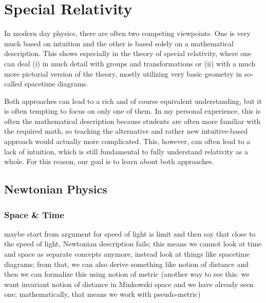 





\chapter{Special Relativity}

\begin{center}
In modern day physics, there are often two competing viewpoints. One is very much based on intuition and the other is based solely on a mathematical description. This shows especially in the theory of special relativity, where one can deal (i) in much detail with groups and transformations or (ii) with a much more pictorial version of the theory, mostly utilizing very basic geometry in so-called spacetime diagrams.

Both approaches can lead to a rich and of course equivalent understanding, but it is often tempting to focus on only one of them. In my personal experience, this is often the mathematical description because students are often more familiar with the required math, so teaching the alternative and rather new intuitive-based approach would actually more complicated. This, however, can often lead to a lack of intuition, which is still fundamental to fully understand relativity as a whole. For this reason, our goal is to learn about both approaches.
\end{center}





\newpage



	\section{Newtonian Physics}
		\subsection{Space \& Time}
maybe start from argument for speed of light is limit and then say that close to the speed of light, Newtonian description fails; this means we cannot look at time and space as separate concepts anymore, instead look at things like spacetime diagrams; from that, we can also derive something like notion of distance and then we can formalize this using notion of metric (another way to see this: we want invariant notion of distance in Minkowski space and we have already seen one; mathematically, that means we work with pseudo-metric)


